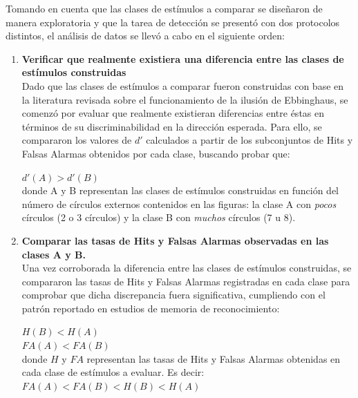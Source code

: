 Tomando en cuenta que las clases de estímulos a comparar se diseñaron de manera exploratoria y que la tarea de detección se presentó con dos protocolos distintos, el análisis de datos se llevó a cabo en el siguiente orden:\\

\begin{enumerate}
\item \textbf{Verificar que realmente existiera una diferencia entre las clases de estímulos construidas}\\

Dado que las clases de estímulos a comparar fueron construidas con base en la literatura revisada sobre el funcionamiento de la ilusión de Ebbinghaus, se comenzó por evaluar que realmente existieran diferencias entre éstas en términos de su discriminabilidad en la dirección esperada. Para ello, se compararon los valores de $d'$ calculados a partir de los subconjuntos de Hits y Falsas Alarmas obtenidos por cada clase, buscando probar que:\\

\begin{center}
 $d'(A) > d'(B)$\\
 donde A y B representan las clases de estímulos construidas en función del número de círculos externos contenidos en las figuras: la clase A con \textit{pocos} círculos (2 o 3 círculos) y la clase B con \textit{muchos} círculos (7 u 8).\\
\end{center}

\item \textbf{Comparar las tasas de Hits y Falsas Alarmas observadas en las clases A y B.}\\

Una vez corroborada la diferencia entre las clases de estímulos construidas, se compararon las tasas de Hits y Falsas Alarmas registradas en cada clase para comprobar que dicha discrepancia fuera significativa, cumpliendo con el patrón reportado en estudios de memoria de reconocimiento:\\

\begin{center}
$H(B) < H(A)$\\
$FA(A) < FA(B)$\\
donde $H$ y $FA$ representan las tasas de Hits y Falsas Alarmas obtenidas en cada clase de estímulos a evaluar. Es decir:\\
$FA(A) < FA(B) < H(B) < H(A)$\\
\end{center}


\end{enumerate}
